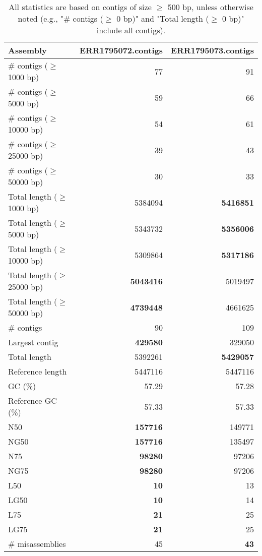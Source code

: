 \documentclass[12pt,a4paper]{article}
\begin{document}
\begin{table}[ht]
\begin{center}
\caption{All statistics are based on contigs of size $\geq$ 500 bp, unless otherwise noted (e.g., "\# contigs ($\geq$ 0 bp)" and "Total length ($\geq$ 0 bp)" include all contigs).}
\begin{tabular}{|l*{2}{|r}|}
\hline
Assembly & ERR1795072.contigs & ERR1795073.contigs \\ \hline
\# contigs ($\geq$ 1000 bp) & 77 & 91 \\ \hline
\# contigs ($\geq$ 5000 bp) & 59 & 66 \\ \hline
\# contigs ($\geq$ 10000 bp) & 54 & 61 \\ \hline
\# contigs ($\geq$ 25000 bp) & 39 & 43 \\ \hline
\# contigs ($\geq$ 50000 bp) & 30 & 33 \\ \hline
Total length ($\geq$ 1000 bp) & 5384094 & {\bf 5416851} \\ \hline
Total length ($\geq$ 5000 bp) & 5343732 & {\bf 5356006} \\ \hline
Total length ($\geq$ 10000 bp) & 5309864 & {\bf 5317186} \\ \hline
Total length ($\geq$ 25000 bp) & {\bf 5043416} & 5019497 \\ \hline
Total length ($\geq$ 50000 bp) & {\bf 4739448} & 4661625 \\ \hline
\# contigs & 90 & 109 \\ \hline
Largest contig & {\bf 429580} & 329050 \\ \hline
Total length & 5392261 & {\bf 5429057} \\ \hline
Reference length & 5447116 & 5447116 \\ \hline
GC (\%) & 57.29 & 57.28 \\ \hline
Reference GC (\%) & 57.33 & 57.33 \\ \hline
N50 & {\bf 157716} & 149771 \\ \hline
NG50 & {\bf 157716} & 135497 \\ \hline
N75 & {\bf 98280} & 97206 \\ \hline
NG75 & {\bf 98280} & 97206 \\ \hline
L50 & {\bf 10} & 13 \\ \hline
LG50 & {\bf 10} & 14 \\ \hline
L75 & {\bf 21} & 25 \\ \hline
LG75 & {\bf 21} & 25 \\ \hline
\# misassemblies & 45 & {\bf 43} \\ \hline

\end{tabular}
\end{center}
\end{table}
\end{document}
